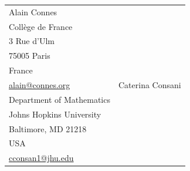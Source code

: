 \documentclass[11pt,a4paper]{article}
\begin{document}
\begin{tabular}{p{} p{}}
\raggedright
Alain Connes\\
Coll\`ege de France\\
3 Rue d'Ulm\\
75005 Paris\\
France\\
\href{mailto:alain@connes.org}{alain@connes.org}
&
\raggedleft
Caterina Consani\\
Department of Mathematics\\
Johns Hopkins University\\
Baltimore, MD 21218\\
USA\\
\href{mailto:cconsan1@jhu.edu}{cconsan1@jhu.edu}
\end{tabular}
\end{document}
